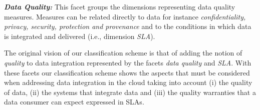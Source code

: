 \textbf{\textit{Data Quality:}} 
This facet groups the dimensions  representing data quality measures. Measures can be related directly to data for instance {\em confidentiality, privacy, security, protection and provenance} and to the conditions in which data is integrated and delivered  (i.e., dimension {\em SLA}).


The original vision of our classification scheme is that of adding the notion of {\em quality} to data integration represented by the facets {\em data quality} 
and  {\em SLA}.
With these facets our classification scheme shows the aspects that must be considered when addressing data integration in the cloud  taking into account (i) the quality of data, (ii) the systems that integrate data and (iii) the quality warranties that a data consumer can expect expressed in SLAs.

